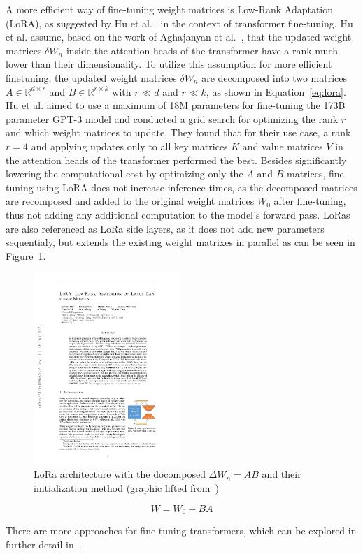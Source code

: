 A more efficient way of fine-tuning weight matrices is Low-Rank Adaptation (LoRA), as suggested by Hu et al.~\cite{Hu2021} in the context of transformer fine-tuning.
Hu et al. assume, based on the work of Aghajanyan et al.~\cite{Aghajanyan2020}, that the updated weight matrices $\delta W_n$ inside the attention heads of the transformer have a rank much lower than their dimensionality.
To utilize this assumption for more efficient finetuning, the updated weight matrices $\delta W_n$ are decomposed into two matrices $A \in \mathbb{R}^{d \times r}$ and $B \in \mathbb{R}^{r \times k}$ with $r \ll d$ and $r \ll k$, as shown in Equation~\ref{eq:lora}.
Hu et al. aimed to use a maximum of 18M parameters for fine-tuning the 173B parameter GPT-3 model and conducted a grid search for optimizing the rank $r$ and which weight matrices to update.
They found that for their use case, a rank $r = 4$ and applying updates only to all key matrices $K$ and value matrices $V$ in the attention heads of the transformer performed the best.
Besides significantly lowering the computational cost by optimizing only the $A$ and $B$ matrices, fine-tuning using LoRA does not increase inference times, as the decomposed matrices are recomposed and added to the original weight matrices $W_0$ after fine-tuning, thus not adding any additional computation to the model's forward pass.
LoRas are also referenced as LoRa side layers, as it does not add new parameters sequentialy, but extends the existing weight matrixes in parallel as can be seen in Figure~\ref{fig:loraarch}.
\begin{figure}[h!]
    \centering
    \includegraphics[width=0.5\textwidth]{images/Hu2021_LoraArch.pdf}
    \caption[LoRa Architecture]{LoRa architecture with the docomposed $\Delta W_n = AB$ and their initialization  method (graphic lifted from~\cite{Hu2021})}\label{fig:loraarch}
\end{figure}

\begin{equation}
    W = W_0 + BA
    \label{eq:lora}
\end{equation}

There are more approaches for fine-tuning transformers, which can be explored in further detail in~\cite{Xin2024}.

